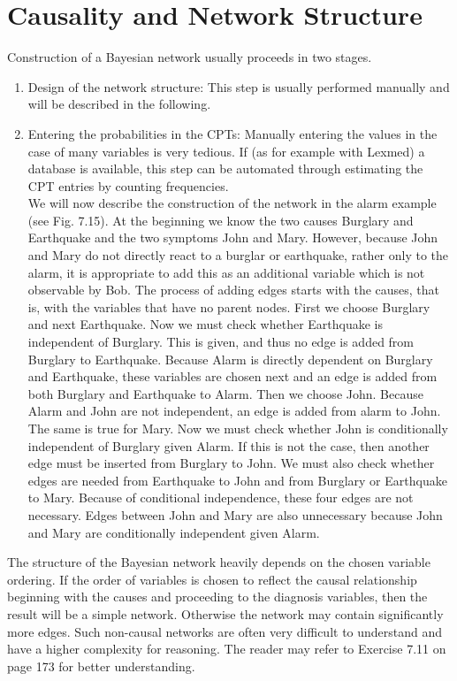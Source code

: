 \documentclass[10pt]{book}
\begin{document}
\section{Causality and Network Structure}
Construction of a Bayesian network usually proceeds in two stages.
\begin{enumerate}
  \item Design of the network structure: This step is usually performed manually and will be described in the following.
  \item Entering the probabilities in the CPTs: Manually entering the values in the case of many variables is very tedious. If (as for example with Lexmed) a database is available, this step can be automated through estimating the CPT entries by counting frequencies.\\
We will now describe the construction of the network in the alarm example (see Fig. 7.15). At the beginning we know the two causes Burglary and Earthquake and the two symptoms John and Mary. However, because John and Mary do not directly react to a burglar or earthquake, rather only to the alarm, it is appropriate to add this as an additional variable which is not observable by Bob. The process of adding edges starts with the causes, that is, with the variables that have no parent nodes. First we choose Burglary and next Earthquake. Now we must check whether Earthquake is independent of Burglary. This is given, and thus no edge is added from Burglary to Earthquake. Because Alarm is directly dependent on Burglary and Earthquake, these variables are chosen next and an edge is added from both Burglary and Earthquake to Alarm. Then we choose John. Because Alarm and John are not independent, an edge is added from alarm to John. The same is true for Mary. Now we must check whether John is conditionally independent of Burglary given Alarm. If this is not the case, then another edge must be inserted from Burglary to John. We must also check whether edges are needed from Earthquake to John and from Burglary or Earthquake to Mary. Because of conditional independence, these four edges are not necessary. Edges between John and Mary are also unnecessary because John and Mary are conditionally independent given Alarm.
\end{enumerate}
The structure of the Bayesian network heavily depends on the chosen variable ordering. If the order of variables is chosen to reflect the causal relationship beginning with the causes and proceeding to the diagnosis variables, then the result will be a simple network. Otherwise the network may contain significantly more edges. Such non-causal networks are often very difficult to understand and have a higher complexity for reasoning. The reader may refer to Exercise 7.11 on page 173 for better understanding.
\end{document}
